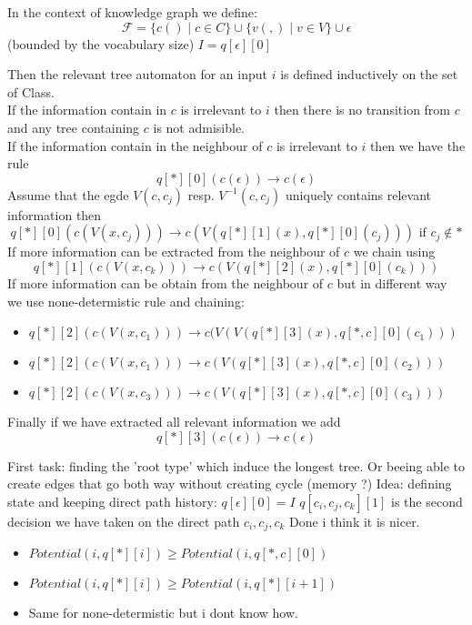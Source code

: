 \documentclass[10pt]{article}
\theoremstyle{definition}
\begin{document}
In the context of knowledge graph we define:
$$\mathcal{F} = \{c() \mid c \in C\} \cup \{v(,) \mid v \in V\} \cup \epsilon$$
(bounded by the vocabulary size)
$I = q[\epsilon][0]$

Then the relevant tree automaton for an input $i$ is defined inductively on the set of Class.
\\If the information contain in $c$ is irrelevant to $i$ then there is no transition from $c$ and any tree containing $c$ is not admisible. 
\\If the information contain in the neighbour of $c$ is irrelevant to $i$ then we have the rule 
$$q[*][0](c(\epsilon)) \rightarrow c(\epsilon)$$
Assume that the egde $V(c,c_j)$ resp. $V^{-1}(c,c_j)$ uniquely contains relevant information then 
$$ q[*][0](c(V(x,c_j))) \rightarrow c(V(q[*][1](x),q[*][0](c_j))) \text{ if } c_j \notin * $$
If more information can be extracted from the neighbour of $c$ we chain using 
$$ q[*][1](c(V(x,c_k))) \rightarrow c(V(q[*][2](x),q[*][0](c_k))) $$
If more information can be obtain from the neighbour of $c$ but in different way we use none-determistic rule and chaining:
\begin{itemize}
    \item $q[*][2](c(V(x,c_1))) \rightarrow c(V(V(q[*][3](x),q[*,c][0](c_1)))$
    \item$q[*][2](c(V(x,c_1))) \rightarrow c(V(q[*][3](x),q[*,c][0](c_2)))$
    \item $q[*][2](c(V(x,c_3))) \rightarrow c(V(q[*][3](x),q[*,c][0](c_3)))$
\end{itemize}
Finally if we have extracted all relevant information we add $$q[*][3](c(\epsilon)) \rightarrow c(\epsilon)$$

First task: finding the 'root type' which induce the longest tree. Or beeing able to create edges that go both way without creating cycle (memory ?)
Idea: defining state and keeping direct path history: $q[\epsilon][0] = I$
$q[c_i,c_j,c_k][1]$ is the second decision we have taken on the direct path $c_i,c_j,c_k$
Done i think it is nicer. 

\begin{itemize}
    \item $Potential(i,q[*][i]) \geq Potential(i,q[*,c][0])$
    \item $Potential(i,q[*][i]) \geq Potential(i,q[*][i+1])$
    \item Same for none-determistic but i dont know how.
\end{itemize}
\end{document}
